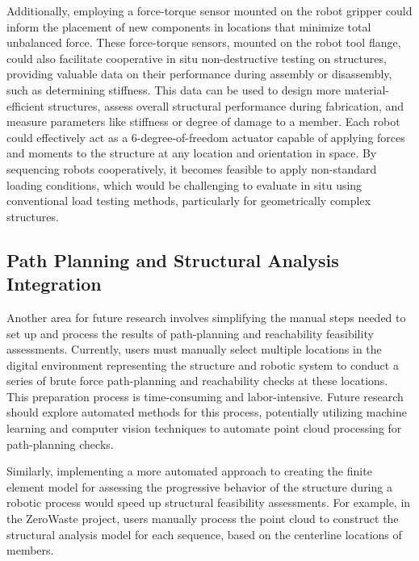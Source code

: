         Additionally, employing a force-torque sensor mounted on the robot gripper could inform the placement of new components in locations that minimize total unbalanced force. These force-torque sensors, mounted on the robot tool flange, could also facilitate cooperative in situ non-destructive testing on structures, providing valuable data on their performance during assembly or disassembly, such as determining stiffness. This data can be used to design more material-efficient structures, assess overall structural performance during fabrication, and measure parameters like stiffness or degree of damage to a member. Each robot could effectively act as a 6-degree-of-freedom actuator capable of applying forces and moments to the structure at any location and orientation in space. By sequencing robots cooperatively, it becomes feasible to apply non-standard loading conditions, which would be challenging to evaluate in situ using conventional load testing methods, particularly for geometrically complex structures.

    \subsection{Path Planning and Structural Analysis Integration}
        Another area for future research involves simplifying the manual steps needed to set up and process the results of path-planning and reachability feasibility assessments. Currently, users must manually select multiple locations in the digital environment representing the structure and robotic system to conduct a series of brute force path-planning and reachability checks at these locations. This preparation process is time-consuming and labor-intensive. Future research should explore automated methods for this process, potentially utilizing machine learning and computer vision techniques to automate point cloud processing for path-planning checks.

        Similarly, implementing a more automated approach to creating the finite element model for assessing the progressive behavior of the structure during a robotic process would speed up structural feasibility assessments. For example, in the ZeroWaste project, users manually process the point cloud to construct the structural analysis model for each sequence, based on the centerline locations of members.

